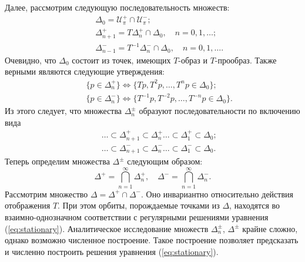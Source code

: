 Далее, рассмотрим следующую последовательность множеств:
%
\begin{eqnarray*}
&& \Delta_0 = \mathcal{U}_{\pi}^+ \cap \mathcal{U}_{\pi}^-; \\
&& \Delta_{n+1}^+ = T \Delta_n^+ \cap \Delta_0, \quad n = 0,1,\dots; \\
&& \Delta_{n-1}^- = T^{-1} \Delta_n^- \cap \Delta_0, \quad n = 0,1,\dots.
\end{eqnarray*}
%
Очевидно, что $\Delta_0$ состоит из точек, имеющих $T$-образ и $T$-прообраз.
Также верными являются следующие утверждения:
%
\begin{eqnarray*}
&& \{ p \in \Delta_n^+ \} \iff \{ Tp, T^2p, \dots, T^np \in \Delta_0 \}; \\
&& \{ p \in \Delta_n^- \} \iff \{ T^{-1}p, T^{-2}p, \dots, T^{-n}p \in \Delta_0 \}.
\end{eqnarray*}
%
Из этого следует, что множества $\Delta_n^{\pm}$ образуют последовательности по включению вида
%
\begin{eqnarray*}
&& \ldots \subset \Delta_{n+1}^+ \subset \Delta_n^+ \ldots \subset \Delta_1^+ \subset \Delta_0; \\
&& \ldots \subset \Delta_{n+1}^- \subset \Delta_n^- \ldots \subset \Delta_1^- \subset \Delta_0.
\end{eqnarray*}
%
Теперь определим множества $\Delta^{\pm}$ следующим образом:
%
\begin{equation*}
\Delta^+ = \bigcap \limits_{n=1}^{\infty} \Delta_n^+, \quad \Delta^- = \bigcap_{n=1}^{\infty} \Delta_n^-.
\end{equation*}
%
Рассмотрим множество $\Delta = \Delta^+ \cap \Delta^-$.
Оно инвариантно относительно действия отображения $T$.
При этом орбиты, порождаемые точками из $\Delta$, находятся во взаимно-однозначном соответствии с регулярными решениями уравнения (\ref{eq:stationary}).
Аналитическое исследование множеств $\Delta_n^{\pm}$, $\Delta^{\pm}$ крайне сложно, однако возможно численное построение.
Такое построение позволяет предсказать и численно построить решения уравнения (\ref{eq:stationary}).

